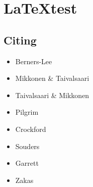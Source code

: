 \chapter{\LaTeX test}

\section{Citing}

\begin{itemize}
\item Berners-Lee \cite{berners2010long}
\item Mikkonen \& Taivalsaari \cite{mikkonen2011apps}
\item Taivalsaari \& Mikkonen \cite{taivalsaari2011web}
\item Pilgrim \cite{pilgrim2010html5}
\item Crockford \cite{crockford2008javascript}
\item Souders \cite{souders2007high}
\item Garrett \cite{garrett2005ajax}
\item Zakas \cite{zakas2010high}
\end{itemize}

